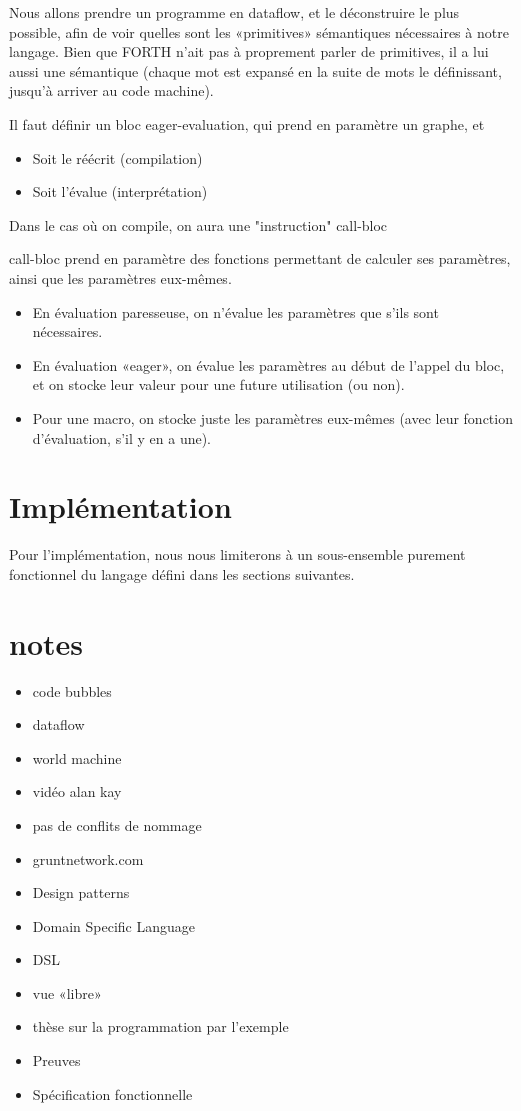 \documentclass{article}
\begin{document}
Nous allons prendre un programme en dataflow, et le déconstruire le plus possible, afin de voir quelles sont les «primitives» sémantiques nécessaires à notre langage. Bien que FORTH n'ait pas à proprement parler de primitives, il a lui aussi une sémantique (chaque mot est expansé en la suite de mots le définissant, jusqu'à arriver au code machine).
  

Il faut définir un bloc eager-evaluation, qui prend en paramètre un graphe, et
\begin{itemize}
\item Soit le réécrit (compilation)
\item Soit l'évalue (interprétation)
\end{itemize}
Dans le cas où on compile, on aura une "instruction" call-bloc

call-bloc prend en paramètre des fonctions permettant de calculer ses paramètres, ainsi que les paramètres eux-mêmes.
\begin{itemize}
\item En évaluation paresseuse, on n'évalue les paramètres que s'ils sont nécessaires.
\item En évaluation «eager», on évalue les paramètres au début de l'appel du bloc, et on stocke leur valeur pour une future utilisation (ou non).
\item Pour une macro, on stocke juste les paramètres eux-mêmes (avec leur fonction d'évaluation, s'il y en a une).
\end{itemize}

\section{Implémentation}
Pour l'implémentation, nous nous limiterons à un sous-ensemble purement fonctionnel du langage défini dans les sections suivantes.

\appendix

\section{notes}
\begin{itemize}
\item code bubbles
\item dataflow
\item world machine
\item vidéo alan kay
\item pas de conflits de nommage
\item gruntnetwork.com
\item Design patterns
\item Domain Specific Language
\item DSL
\item vue «libre»
\item thèse sur la programmation par l'exemple
\item Preuves
\item Spécification fonctionnelle
\end{itemize}
\end{document}
